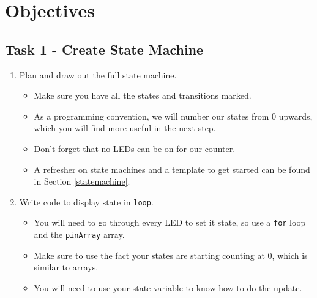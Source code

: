 \documentclass{article}
\begin{document}
\section{Objectives}
    \subsection{Task 1 - Create State Machine}
        \begin{enumerate}
            \item Plan and draw out the full state machine.
            \begin{itemize}
                \item Make sure you have all the states and transitions marked. 
                \item As a programming convention, we will number our states from 0 upwards, which you will find more useful in the next step.
                \item Don't forget that no LEDs can be on for our counter.
                \item A refresher on state machines and a template to get started can be found in Section \ref{statemachine}.
            \end{itemize}
            \item Write code to display state in \texttt{loop}.
            \begin{itemize}
                \item You will need to go through every LED to set it state, so use a \texttt{for} loop and the \texttt{pinArray} array.
                \item Make sure to use the fact your states are starting counting at 0, which is similar to arrays. 
                \item You will need to use your state variable to know how to do the update.
            \end{itemize}
        \end{enumerate}
\end{document}
